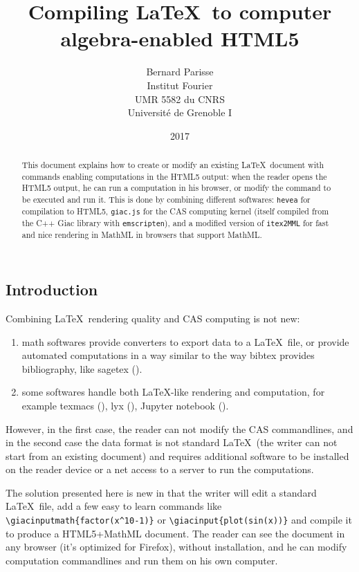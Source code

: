 \documentclass{article}
\title{Compiling \LaTeX\ to computer algebra-enabled HTML5}
\author{Bernard Parisse\\Institut Fourier\\UMR 5582 du
  CNRS\\Universit\'e de Grenoble I}
\date{2017}
\begin{document}
\begin{giacjshere}
\maketitle

\begin{abstract}
This document explains how to create or modify an
existing \LaTeX\ document with commands enabling computations in 
the HTML5 output: when the reader opens the HTML5
output, he can run a computation in his browser, or
modify the command to be executed and run it.
This is done by combining different softwares: \verb|hevea|\cite{hevea}
for compilation to HTML5, \verb|giac.js| for the CAS computing kernel
(itself compiled from the C++ Giac\cite{giac} library with 
\verb|emscripten|\cite{emscripten}), and 
a modified version\cite{hevea2mml} of \verb|itex2MML|\cite{itex2mml} 
for fast and nice rendering in
MathML in browsers that support MathML.
\end{abstract}

\tableofcontents
\printindex


\section{Introduction}
Combining \LaTeX\ rendering quality and CAS computing is not new:
\begin{enumerate}
\item math softwares provide converters to export data to a \LaTeX\ file,
or provide automated computations in a way similar 
to the way bibtex provides bibliography, like sagetex (\cite{sagetex}).
\item some softwares handle both \LaTeX-like rendering and
computation, for example texmacs (\cite{texmacs}), lyx (\cite{lyx}), 
Jupyter notebook (\cite{jupyter}). 
 \end{enumerate}
However, in the first case,
the reader can not modify the CAS commandlines, and in the second
case the data format is not standard \LaTeX\ (the writer can not
start from an existing document)
and requires additional software to be installed on
the reader device or a net access to a server 
to run the computations.

The solution presented here is new in that the writer will edit
a standard \LaTeX\ file, add a few easy to learn commands like
\verb|\giacinputmath{factor(x^10-1)}| or \verb|\giacinput{plot(sin(x))}|
and compile it to produce a HTML5+MathML
document. 
The reader can see the document in any browser 
(it's optimized for Firefox), without installation, and he can 
modify computation commandlines
and run them on his own computer.


\end{giacjshere}
\end{document}
